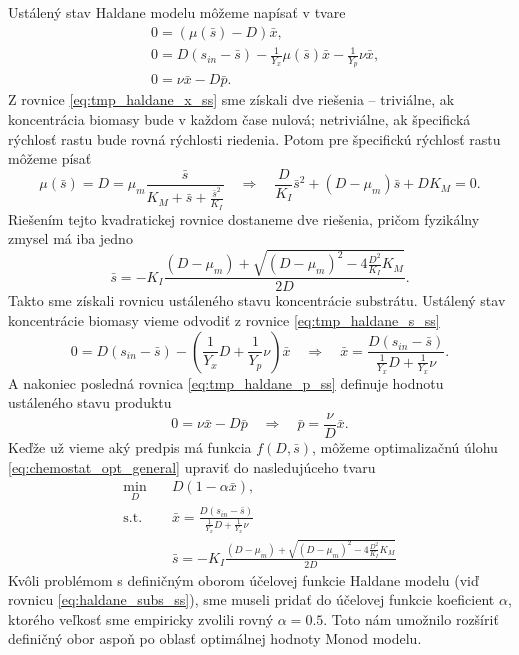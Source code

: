 Ustálený stav Haldane modelu môžeme napísať v tvare
\begin{align}
	&0 = \left(\mu(\bar{s}) - D\right)\bar{x}, \label{eq:tmp_haldane_x_ss}\\
	&0 = D\left(s_{in} - \bar{s}\right) - \frac{1}{Y_{x}}\mu(\bar{s})\bar{x} - \frac{1}{Y_{p}}\nu \bar{x}, \label{eq:tmp_haldane_s_ss}\\
	&0 = \nu \bar{x} - D\bar{p} \label{eq:tmp_haldane_p_ss}.
\end{align}
Z rovnice \eqref{eq:tmp_haldane_x_ss} sme získali dve riešenia -- triviálne, ak koncentrácia biomasy bude v každom čase nulová; netriviálne, ak špecifická rýchlosť rastu bude rovná rýchlosti riedenia. Potom pre špecifickú rýchlosť rastu môžeme písať 
\begin{equation}
	\mu(\bar{s}) = D = \mu_{m}\frac{\bar{s}}{K_{M} + \bar{s} + \frac{\bar{s}^2}{K_{I}}} \quad \Longrightarrow \quad
	\frac{D}{K_{I}}\bar{s}^2 + (D-\mu_{m})\bar{s} + DK_{M} = 0.
\end{equation}
Riešením tejto kvadratickej rovnice dostaneme dve riešenia, pričom fyzikálny zmysel má iba jedno
\begin{equation}
	\label{eq:haldane_subs_ss}
	\bar{s} = -K_{I}\frac{\left(D-\mu_{m}\right) + \sqrt{\left(D-\mu_{m}\right)^2 - 4\frac{D^2}{K_{I}}K_{M}}}{2D}. 
\end{equation}
Takto sme získali rovnicu ustáleného stavu koncentrácie substrátu. Ustálený stav koncentrácie biomasy vieme odvodiť z rovnice \eqref{eq:tmp_haldane_s_ss}
\begin{equation}
\label{eq:haldane_biomass_ss}
	0 = D\left(s_{in}-\bar{s}\right) - \left(\frac{1}{Y_{x}}D + \frac{1}{Y_{p}}\nu\right)\bar{x} \quad \Longrightarrow \quad
	\bar{x} = \frac{D\left(s_{in}-\bar{s}\right)}{\frac{1}{Y_{x}}D + \frac{1}{Y_{x}}\nu}. 
\end{equation}
A nakoniec posledná rovnica \eqref{eq:tmp_haldane_p_ss} definuje hodnotu ustáleného stavu produktu
\begin{equation}
\label{eq:haldane_product_ss}
	0 = \nu \bar{x} - D\bar{p} \quad \Longrightarrow \quad \bar{p} = \frac{\nu}{D}\bar{x}.
\end{equation}
Keďže už vieme aký predpis má funkcia $ f(D,\bar{s}) $, môžeme optimalizačnú úlohu \eqref{eq:chemostat_opt_general} upraviť do nasledujúceho tvaru 
\begin{equation}
\label{eq:chemostat_opt_w_ss}
	 \begin{split}
		 \min_{D} &\quad D\left(1-\alpha\bar{x}\right), \\
		 \text{s.t.} &\quad \bar{x} = \frac{D\left(s_{in}-\bar{s}\right)}{\frac{1}{Y_{x}}D + \frac{1}{Y_{x}}\nu} \\
		 &\quad \bar{s} = -K_{I}\frac{\left(D-\mu_{m}\right) + \sqrt{\left(D-\mu_{m}\right)^2 - 4\frac{D^2}{K_{I}}K_{M}}}{2D}
	 \end{split}
\end{equation}
Kvôli problémom s definičným oborom účelovej funkcie Haldane modelu (viď rovnicu \eqref{eq:haldane_subs_ss}), sme museli pridať do účelovej funkcie koeficient $ \alpha $, ktorého veľkosť sme empiricky zvolili rovný $ \alpha = 0.5 $. Toto nám umožnilo rozšíriť definičný obor aspoň po oblasť optimálnej hodnoty Monod modelu.

